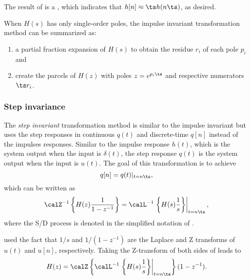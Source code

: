 

The result of  is a , which indicates
that $h[n] \approx \ts h(n \ts)$, as desired.
\eExample

When $H(s)$ has only single-order poles, the impulse invariant transformation method can
be summarized as:
\begin{enumerate}
	\item a partial fraction expansion of $H(s)$ to obtain the residue $r_i$ of each pole $p_i$ and
	\item create the parcels of $H(z)$ with poles $z=e^{p_i \ts}$ and respective
	numerators $\ts r_i$.
\end{enumerate}

\subsubsection{Step invariance}

The \emph{step invariant} transformation method is similar to the impulse invariant but uses
the step responses in continuous $q(t)$ and discrete-time $q[n]$ instead of the impulses responses. Similar to the impulse response $h(t)$, which is the system output when the input is $\delta(t)$, the step response $q(t)$ is the system output when the input is $u(t)$. The goal of this transformation is to achieve 
\begin{equation}
q[n] = q(t)|_{t=n\ts},
\label{eq:step_invarianceCriterion}
\end{equation}
which can be written as 
\begin{equation}
\calZ^{-1} \left\{ H(z) \frac{1}{1-z^{-1}} \right\} = \calL^{-1} \left. \left\{ H(s) \frac{1}{s} \right\} \right|_{t=n\ts},
\label{eq:stepInvariance}
\end{equation}
where the S/D process is denoted in the simplified notation of . 

 used the fact that $1/s$ and $1/(1-z^{-1})$ are the Laplace and Z transforms
of $u(t)$ and $u[n]$, respectively.
Taking the Z-transform of both sides of  leads to
\begin{equation}
H(z) = \calZ \left\{ \calL^{-1} \left. \left\{ H(s) \frac{1}{s} \right\} \right|_{t=n\ts} \right\} (1-z^{-1}).
\label{eq:stepInvariance2}
\end{equation}

